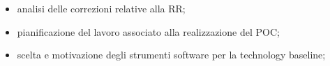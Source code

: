 \begin{itemize}
	\item analisi delle correzioni relative alla RR;
	\item pianificazione del lavoro associato alla realizzazione del POC;
	\item scelta e motivazione degli strumenti software per la technology baseline;
\end{itemize}
